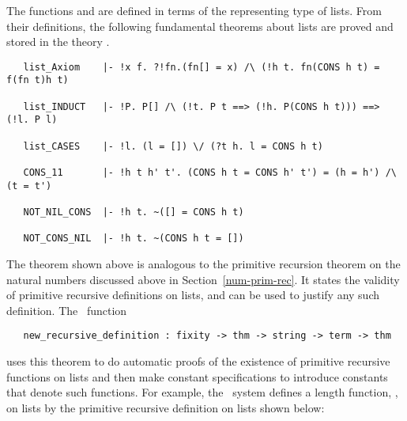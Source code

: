 The functions  and  are defined in terms of the representing
type of lists. From their definitions, the following fundamental theorems about
lists
are proved and stored in the theory .

\begin{hol}
\begin{verbatim}
   list_Axiom    |- !x f. ?!fn.(fn[] = x) /\ (!h t. fn(CONS h t) = f(fn t)h t)

   list_INDUCT   |- !P. P[] /\ (!t. P t ==> (!h. P(CONS h t))) ==> (!l. P l)

   list_CASES    |- !l. (l = []) \/ (?t h. l = CONS h t)

   CONS_11       |- !h t h' t'. (CONS h t = CONS h' t') = (h = h') /\ (t = t')

   NOT_NIL_CONS  |- !h t. ~([] = CONS h t)

   NOT_CONS_NIL  |- !h t. ~(CONS h t = [])
\end{verbatim}\end{hol}

The theorem    shown  above  is  analogous   to  the  primitive
recursion theorem on the
natural numbers discussed above in
Section~\ref{num-prim-rec}.  It  states  the  validity  of  primitive recursive
definitions on lists, and can be used to justify any such definition.  The \ML\
function

\begin{boxed}
\begin{verbatim}
   new_recursive_definition : fixity -> thm -> string -> term -> thm
\end{verbatim}\end{boxed}

\noindent uses this theorem to do automatic
 proofs of the existence of primitive
recursive functions on lists and then make constant specifications to introduce
constants that  denote  such  functions.  For example, the \HOL\ system defines
a length function, \ml{LENGTH}, on lists by the primitive recursive
definition on lists shown below:

